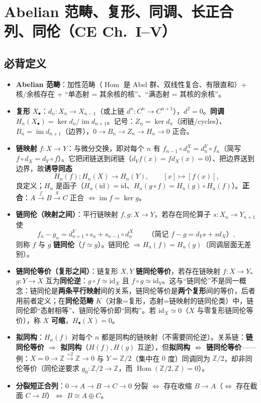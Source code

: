 \documentclass[12pt,a4paper]{ctexart}
\DeclareMathOperator{\Hom}{Hom}
\DeclareMathOperator{\im}{im}
\newcommand{\keypoint}{\text{\textbf{\ensuremath{\bigstar}}\;}}
\begin{document}
\section{Abelian 范畴、复形、同调、长正合列、同伦（CE Ch.~I--V）}

\subsection{必背定义}

\begin{itemize}
  \item \textbf{Abelian 范畴}：加性范畴（$\Hom$ 是 Abel 群、双线性复合、有限直和）+ 核/余核存在 + “单态射 = 其余核的核”、“满态射 = 其核的余核”。
  \item \textbf{复形} $X_\bullet$：$d_n\colon X_n\to X_{n-1}$（或上链 $d^n\colon C^n\to C^{n+1}$），$d^2=0$。\textbf{同调} $H_n(X_\bullet)=\ker d_n/\im d_{n+1}$。记号：$Z_n=\ker d_n$（闭链/cycles）、$B_n=\im d_{n+1}$（边界），$0\to B_n\to Z_n\to H_n\to0$ 正合。
  \item \textbf{链映射} $f\colon X\to Y$：与微分交换，即对每个 $n$ 有 $f_{n-1}\circ d^X_n=d^Y_n\circ f_n$（简写 $f\circ d_X=d_Y\circ f$）。它把闭链送到闭链（$d_Yf(x)=fd_X(x)=0$）、把边界送到边界，故\textbf{诱导同态}
  \[
    H_n(f)\colon H_n(X)\longrightarrow H_n(Y),\qquad [x]\longmapsto[f(x)],
  \]
  良定义；$H_n$ 是函子（$H_n(\mathrm{id})=\mathrm{id}$、$H_n(g\circ f)=H_n(g)\circ H_n(f)$）。\textbf{正合}：$A\xrightarrow{f}B\xrightarrow{g}C$ 正合 $\iff\im f=\ker g$。
  \item \textbf{链同伦（映射之间）}：平行链映射 $f,g\colon X\to Y$，若存在同伦算子 $s\colon X_n\to Y_{n+1}$ 使
  \[
    f_n-g_n=d^Y_{n+1}\circ s_n+s_{n-1}\circ d^X_n
    \qquad\text{（简记 } f-g=d_Ys+sd_X\text{）},
  \]
  则称 $f$ 与 $g$ \textbf{链同伦}（$f\simeq g$）。\keypoint 链同伦 $\Rightarrow H_n(f)=H_n(g)$（同调层面无差别）。
  \item \textbf{链同伦等价（复形之间）}：链复形 $X,Y$ \textbf{链同伦等价}，若存在链映射 $f\colon X\to Y$、$g\colon Y\to X$ 互为\textbf{同伦逆}：$g\circ f\simeq\mathrm{id}_X$ 且 $f\circ g\simeq\mathrm{id}_Y$。\keypoint 这与“链同伦”不是同一概念：链同伦是\textbf{两条平行映射}间的关系，链同伦等价是\textbf{两个复形}间的等价，后者用前者定义；在\textbf{同伦范畴} $K$（对象=复形，态射=链映射的链同伦类）中，链同伦即“态射相等”、链同伦等价即“同构”。若 $\mathrm{id}_X\simeq 0$（$X$ 与零复形链同伦等价），称 $X$ \textbf{可缩}，$H_\bullet(X)=0$。
  \item \textbf{拟同构}：$H_n(f)$ 对每个 $n$ 都是同构的链映射（不需要同伦逆）。\keypoint 关系链：\textbf{链同伦等价 $\Rightarrow$ 拟同构}（$H(f),H(g)$ 互逆），但\textbf{拟同构 $\not\Rightarrow$ 链同伦等价}——例：$X=0\to\mathbb Z\xrightarrow{\times2}\mathbb Z\to0$ 与 $Y=\mathbb Z/2$（集中在 $0$ 度）同调同为 $\mathbb Z/2$，却非同伦等价（同伦逆要求 $g_0\colon\mathbb Z/2\to\mathbb Z$，而 $\Hom(\mathbb Z/2,\mathbb Z)=0$）。
  \item \textbf{分裂短正合列}：$0\to A\to B\to C\to0$ 分裂 $\iff$ 存在收缩 $B\to A$（$\iff$ 存在截面 $C\to B$）$\iff$ $B\cong A\oplus C$。
\end{itemize}
\end{document}
